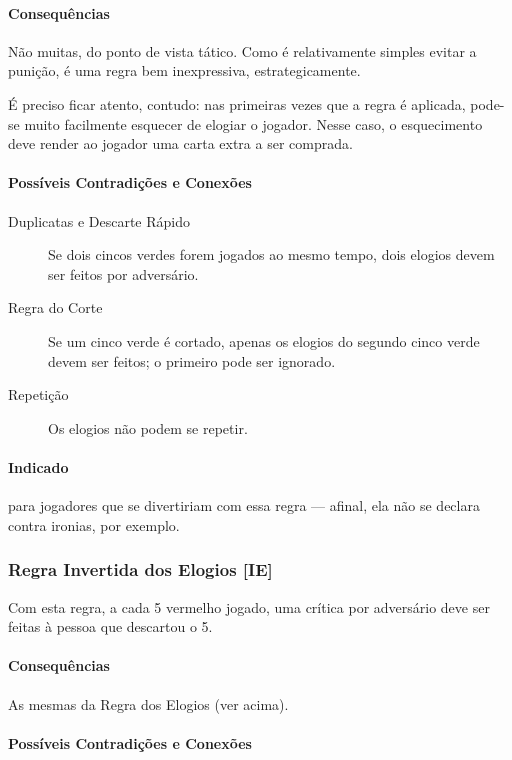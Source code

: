 \paragraph{Consequências}

Não muitas, do ponto de vista tático. Como é relativamente simples evitar a punição, é uma regra bem inexpressiva, estrategicamente.

É preciso ficar atento, contudo: nas primeiras vezes que a regra é aplicada, pode-se muito facilmente esquecer de elogiar o jogador. Nesse caso, o esquecimento deve render ao jogador uma carta extra a ser comprada.

\paragraph{Possíveis Contradições e Conexões}

\begin{description}
\item[Duplicatas e Descarte Rápido]{Se dois cincos verdes forem jogados ao mesmo tempo, dois elogios devem ser feitos por adversário.}
\item[Regra do Corte]{Se um cinco verde é cortado, apenas os elogios do segundo cinco verde devem ser feitos; o primeiro pode ser ignorado.}
\item[Repetição]{Os elogios não podem se repetir.}
\end{description}

\paragraph{Indicado} 

para jogadores que se divertiriam com essa regra --- afinal, ela não se declara contra ironias, por exemplo.

\subsubsection{Regra Invertida dos Elogios [IE]}

Com esta regra, a cada 5 vermelho jogado, uma crítica por adversário deve ser feitas à pessoa que descartou o 5.

\paragraph{Consequências}

As mesmas da Regra dos Elogios (ver acima).

\paragraph{Possíveis Contradições e Conexões}

